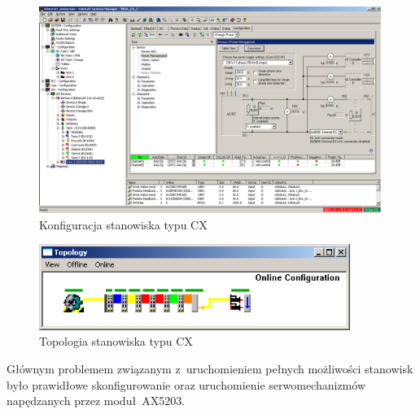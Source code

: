 \begin{figure}[!htb] 	\centering 	\includegraphics[width=0.99\textwidth]{images/confCX} \caption{Konfiguracja stanowiska typu CX} \label{conf:cx} \end{figure}
\begin{figure}[!htb] 	\centering 	\includegraphics[width=0.9\textwidth]{images/topologyCX} \caption{Topologia stanowiska typu CX} \label{topology:cx} \end{figure}

Głównym problemem związanym z~uruchomieniem pełnych możliwości stanowisk było prawidłowe skonfigurowanie oraz uruchomienie serwomechanizmów napędzanych przez moduł~AX5203.
%
%

%
%
%
